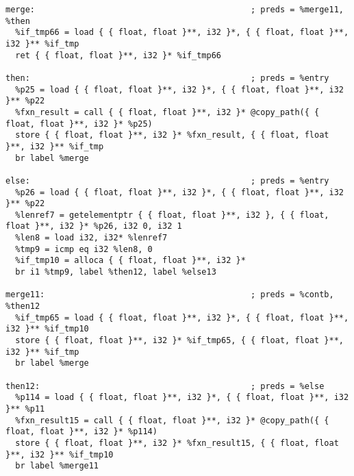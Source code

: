 \documentclass[main.tex]{subfiles}
\begin{document}
{\begin{lstlisting}
merge:                                            ; preds = %merge11, %then
  %if_tmp66 = load { { float, float }**, i32 }*, { { float, float }**, i32 }** %if_tmp
  ret { { float, float }**, i32 }* %if_tmp66

then:                                             ; preds = %entry
  %p25 = load { { float, float }**, i32 }*, { { float, float }**, i32 }** %p22
  %fxn_result = call { { float, float }**, i32 }* @copy_path({ { float, float }**, i32 }* %p25)
  store { { float, float }**, i32 }* %fxn_result, { { float, float }**, i32 }** %if_tmp
  br label %merge

else:                                             ; preds = %entry
  %p26 = load { { float, float }**, i32 }*, { { float, float }**, i32 }** %p22
  %lenref7 = getelementptr { { float, float }**, i32 }, { { float, float }**, i32 }* %p26, i32 0, i32 1
  %len8 = load i32, i32* %lenref7
  %tmp9 = icmp eq i32 %len8, 0
  %if_tmp10 = alloca { { float, float }**, i32 }*
  br i1 %tmp9, label %then12, label %else13

merge11:                                          ; preds = %contb, %then12
  %if_tmp65 = load { { float, float }**, i32 }*, { { float, float }**, i32 }** %if_tmp10
  store { { float, float }**, i32 }* %if_tmp65, { { float, float }**, i32 }** %if_tmp
  br label %merge

then12:                                           ; preds = %else
  %p114 = load { { float, float }**, i32 }*, { { float, float }**, i32 }** %p11
  %fxn_result15 = call { { float, float }**, i32 }* @copy_path({ { float, float }**, i32 }* %p114)
  store { { float, float }**, i32 }* %fxn_result15, { { float, float }**, i32 }** %if_tmp10
  br label %merge11


\end{lstlisting}}
\end{document}

